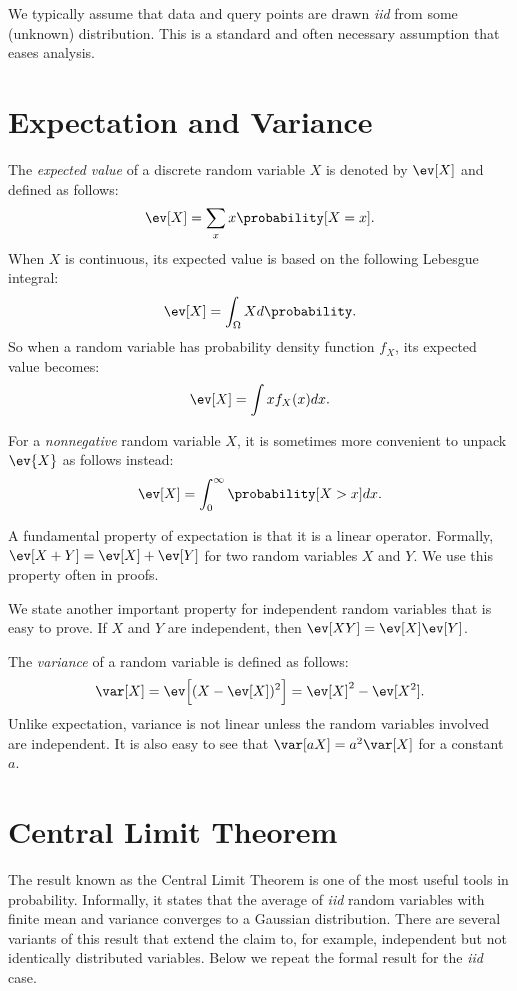 We typically assume that data and query points are drawn \emph{iid} from some
(unknown) distribution. This is a standard and often necessary assumption
that eases analysis.

\section{Expectation and Variance}

The \emph{expected value} of a discrete random variable $X$ is denoted by $\ev[X]$
and defined as follows:
\begin{equation*}
    \ev[X] = \sum_x x \probability[X = x].
\end{equation*}
When $X$ is continuous, its expected value is based on the following Lebesgue integral:
\begin{equation*}
    \ev[X] = \int_{\Omega} X d \probability.
\end{equation*}
So when a random variable has probability density function $f_X$, its expected value
becomes:
\begin{equation*}
    \ev[X] = \int x f_X(x) dx.
\end{equation*}

For a \emph{nonnegative} random variable $X$, it is sometimes more convenient to
unpack $\ev{X}$ as follows instead:
\begin{equation*}
    \ev[X] = \int_0^\infty \probability[X > x] dx.
\end{equation*}

A fundamental property of expectation is that it is a linear operator.
Formally, $\ev[X + Y] = \ev[X] + \ev[Y]$ for two random variables $X$ and $Y$.
We use this property often in proofs.

We state another important property for independent random variables
that is easy to prove.
If $X$ and $Y$ are independent, then $\ev[XY] = \ev[X]\ev[Y]$.

\bigskip

The \emph{variance} of a random variable is defined as follows:
\begin{equation*}
    \var[X] = \ev\Big[ (X - \ev[X])^2 \Big] = \ev[X]^2 - \ev[X^2].
\end{equation*}
Unlike expectation, variance is not linear unless the random variables involved
are independent. It is also easy to see that $\var[aX] = a^2 \var[X]$ for a
constant $a$.

\section{Central Limit Theorem}
The result known as the Central Limit Theorem is one of the most
useful tools in probability. Informally, it states that the average of \emph{iid}
random variables with finite mean and variance converges to a Gaussian distribution.
There are several variants of this result that extend the claim to, for example,
independent but not identically distributed variables. Below we repeat the formal
result for the \emph{iid} case.

